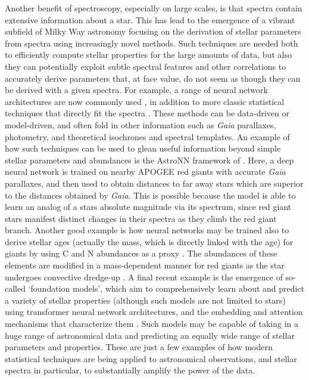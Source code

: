 Another benefit of spectroscopy, especially on large scales, is that spectra contain extensive information about a star. This has lead to the emergence of a vibrant subfield of Milky Way astronomy focusing on the derivation of stellar parameters from spectra using increasingly novel methods. Such techniques are needed both to efficiently compute stellar properties for the large amounts of data, but also they can potentially exploit subtle spectral features and other correlations to accurately derive parameters that, at face value, do not seem as though they can be derived with a given spectra. For example, a range of neural network architectures are now commonly used \parencite[e.g.][]{leung19a,leung19b,ting19}, in addition to more classic statistical techniques that directly fit the spectra \parencite[e.g.][]{ness15,queiroz18,cargile20}. These methods can be data-driven or model-driven, and often fold in other information such as \textit{Gaia} parallaxes, photometry, and theoretical isochrones and spectral templates. An example of how such techniques can be used to glean useful information beyond simple stellar parameters and abundances is the AstroNN framework of \textcite{leung19b}. Here, a deep neural network is trained on nearby APOGEE red giants with accurate \textit{Gaia} parallaxes, and then used to obtain distances to far away stars which are superior to the distances obtained by \textit{Gaia}. This is possible because the model is able to learn an analog of a stars absolute magnitude via its spectrum, since red giant stars manifest distinct changes in their spectra as they climb the red giant branch. Another good example is how neural networks may be trained also to derive stellar ages (actually the mass, which is directly linked with the age) for giants by using C and N abundances as a proxy \parencite{leung23}. The abundances of these elements are modified in a mass-dependent manner for red giants as the star undergoes convective dredge-up \parencite{martig16}. A final recent example is the emergence of so-called `foundation models', which aim to comprehensively learn about and predict a variety of stellar properties (although such models are not limited to stars) using transformer neural network architectures, and the embedding and attention mechanisms that characterize them \parencite[e.g.][]{leung24}. Such models may be capable of taking in a huge range of astronomical data and predicting an equally wide range of stellar parameters and properties. These are just a few examples of how modern statistical techniques are being applied to astronomical observations, and stellar spectra in particular, to substantially amplify the power of the data.


